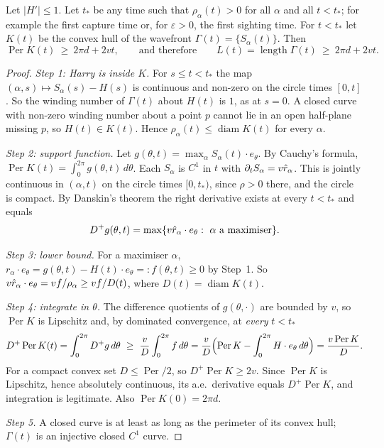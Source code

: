 \begin{theorem}\label{thm:G1}
Let $|H'|\le1$. Let $t_*$ be any time such that $\rho_\alpha(t)>0$ for all $\alpha$ and all $t<t_*$; for example the first capture
time or, for $\varepsilon>0$, the first sighting time. For $t<t_*$ let $K(t)$ be the convex hull of the wavefront
$\Gamma(t)=\{S_\alpha(t)\}$. Then
\[
\operatorname{Per}K(t)\ \ge\ 2\pi d+2vt,\qquad\text{and therefore}\qquad L(t)=\operatorname{length}\Gamma(t)\ \ge\ 2\pi d+2vt .
\]
\end{theorem}
\begin{proof}
\emph{Step 1: Harry is inside $K$.} For $s\le t<t_*$ the map $(\alpha,s)\mapsto S_\alpha(s)-H(s)$ is continuous and non-zero on
the circle times $[0,t]$. So the winding number of $\Gamma(t)$ about $H(t)$ is $1$, as at $s=0$. A closed curve with non-zero
winding number about a point $p$ cannot lie in an open half-plane missing $p$, so $H(t)\in K(t)$. Hence $\rho_\alpha(t)\le
\operatorname{diam}K(t)$ for every $\alpha$.

\emph{Step 2: support function.} Let $g(\theta,t)=\max_\alpha S_\alpha(t)\cdot e_\theta$. By Cauchy's formula,
$\operatorname{Per}K(t)=\int_0^{2\pi}g(\theta,t)\,d\theta$. Each $S_\alpha$ is $C^1$ in $t$ with $\partial_tS_\alpha=v\hat r_\alpha$. This is
jointly continuous in $(\alpha,t)$ on the circle times $[0,t_*)$, since $\rho>0$ there, and the circle is compact. By Danskin's
theorem the right derivative exists at every $t<t_*$ and equals
\[
D^+g(\theta,t)=\max\{v\hat r_\alpha\cdot e_\theta:\ \alpha\text{ a maximiser}\}.
\]

\emph{Step 3: lower bound.} For a maximiser $\alpha$, $r_\alpha\cdot e_\theta=g(\theta,t)-H(t)\cdot e_\theta=:f(\theta,t)\ge0$ by Step~1. So
$v\hat r_\alpha\cdot e_\theta=vf/\rho_\alpha\ge vf/D(t)$, where $D(t)=\operatorname{diam}K(t)$.

\emph{Step 4: integrate in $\theta$.} The difference quotients of $g(\theta,\cdot)$ are bounded by $v$, so $\operatorname{Per}K$ is
Lipschitz and, by dominated convergence, at \emph{every} $t<t_*$
\[
D^+\operatorname{Per}K(t)=\int_0^{2\pi}D^+g\,d\theta\ \ge\ \frac vD\int_0^{2\pi}f\,d\theta
=\frac vD\Bigl(\operatorname{Per}K-\int_0^{2\pi}H\cdot e_\theta\,d\theta\Bigr)=\frac{v\operatorname{Per}K}{D}.
\]
For a compact convex set $D\le\operatorname{Per}/2$, so $D^+\operatorname{Per}K\ge2v$. Since $\operatorname{Per}K$ is Lipschitz, hence
absolutely continuous, its a.e.\ derivative equals $D^+\operatorname{Per}K$, and integration is legitimate. Also
$\operatorname{Per}K(0)=2\pi d$.

\emph{Step 5.} A closed curve is at least as long as the perimeter of its convex hull; $\Gamma(t)$ is an injective closed $C^1$
curve.
\end{proof}

